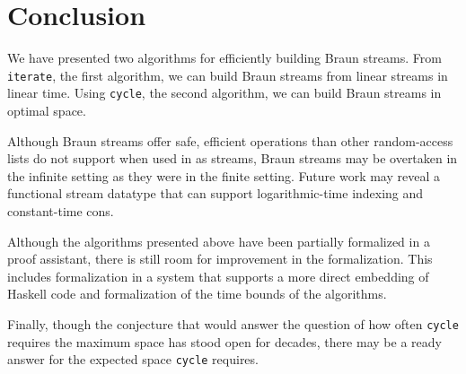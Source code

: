 \documentclass[envcountsect]{llncs}
\begin{document}
\begin{comment}
how many lines?
how many generated lines?
hiccups:
* subtraction
* repeated function application not built-in (show equal to another formulation)
\end{comment}

\section{Conclusion}
\label{conclSect}

We have presented two algorithms for efficiently building Braun streams.
From {\tt iterate}, the first algorithm, we can build Braun streams from linear streams in linear time.
Using {\tt cycle}, the second algorithm, we can build Braun streams in optimal space.

Although Braun streams offer safe, efficient operations than other random-access lists do not support when used in as streams, Braun streams may be overtaken in the infinite setting as they were in the finite setting.
Future work may reveal a functional stream datatype that can support logarithmic-time indexing and constant-time cons.

Although the algorithms presented above have been partially formalized in a proof assistant, there is still room for improvement in the formalization.
This includes formalization in a system that supports a more direct embedding of Haskell code and formalization of the time bounds of the algorithms.

Finally, though the conjecture that would answer the question of how often {\tt cycle} requires the maximum space has stood open for decades, there may be a ready answer for the expected space {\tt cycle} requires.

\begin{comment}
Is there a data structure that provides terminating constant-time \verb|cons|?

Also good for finite Braun trees, because can get index i in time $i$, not $n+i$

Formalizing in a language with extraction

Formalizing time and space complexity

complete formalization

average case space complexity of cycle
\end{comment}



\end{document}
